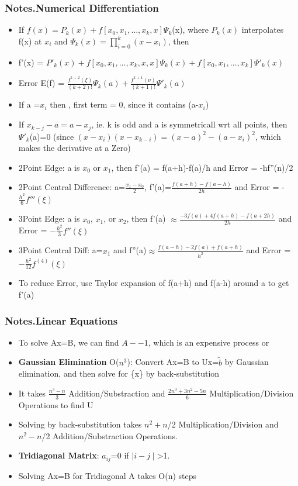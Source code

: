 \documentclass[12pt,letterpaper]{article}
\newcommand\asgnname{Notes}         %
\newenvironment{answer}[1]{
  \subsubsection*{%
  \asgnname.#1}
}{\newpage}
\begin{document}
\begin{answer}{Numerical Differentiation}
\begin{itemize}
    \item If $f(x) = P_k(x) + f[ x_0, x_1, \ldots, x_k, x ]\Psi_k$(x), where $P_k(x)$ interpolates f(x) at $x_i$ and $\Psi_k(x) = \prod_{i=0}^k(x-x_i)$, then
    \item f'(x) = $P'_k(x) + f[ x_0, x_1, \ldots, x_k, x, x]\Psi_k(x) + f[ x_0, x_1, \ldots, x_k ]\Psi '_k(x)$
    \item Error E(f) = $\frac{f^{k+2}(\xi)}{(k+2)!}\Psi_k(a) + \frac{f^{k+1}(\nu)}{(k+1)!}\Psi '_k(a)$ 
    \item If a =$x_i$ then , first term = 0, since it contains (a-$x_i$)
    \item If $x_{k-j} - a = a - x_j$, ie. k is odd and a is symmetricall wrt all points, then $\Psi '_k$(a)=0 (since $(x-x_i)(x-x_{k-i})=(x-a)^2-(a-x_i)^2$, which makes the derivative at a Zero)
    \item 2Point Edge: a is $x_0$ or $x_1$, then f'(a) = f(a+h)-f(a)/h and Error = -hf''(n)/2
    \item 2Point Central Difference: a=$\frac{x_1-x_0}{2}$, f'(a)=$\frac{f(a+h)-f(a-h)}{2h}$ and Error = -$\frac{h^2}{6}f'''(\xi)$
    \item 3Point Edge: a is $x_0$, $x_1$, or $x_2$, then f'(a) $\approx \frac{-3f(a)+4f(a+h)-f(a+2h)}{2h}$ and Error = $-\frac{h^2}{3}f''(\xi)$
    \item 3Point Central Diff: a=$x_1$ and f''(a)$\approx \frac{f(a-h)-2f(a)+f(a+h)}{h^2}$ and Error = $-\frac{h^2}{12}f^{(4)}(\xi)$
    \item To reduce Error, use Taylor expansion of f(a+h) and f(a-h) around a to get f'(a)
\end{itemize}
\end{answer}

\begin{answer}{Linear Equations}
\begin{itemize}
    \item To solve Ax=B, we can find $A-{-1}$, which is an expensive process or
    \item \textbf{Gaussian Elimination} O($n^3$): Convert Ax=B to Ux=$\tilde{b}$ by Gaussian elimination, and then solve for \{x\} by back-substitution
    \item It takes $\frac{n^3-n}{3}$ Addition/Substraction and $\frac{2n^3+3n^2-5n}{6}$ Multiplication/Division Operations to find U
    \item Solving by back-substitution takes $n^2+n$/2 Multiplication/Division and $n^2-n$/2 Addition/Substraction Operations.
    \item \textbf{Tridiagonal Matrix}: $a_{ij}$=0 if $\mid i-j \mid$>1. 
    \item Solving Ax=B for Tridiagonal A takes O(n) steps
\end{itemize}
\end{answer}
\end{document}
